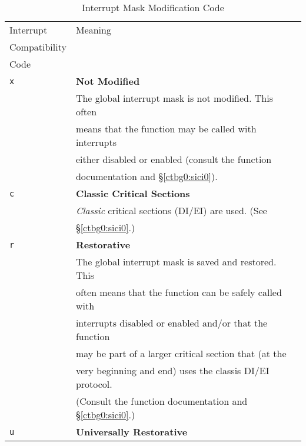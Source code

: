 \begin{table}
\caption{Interrupt Mask Modification Code}
\label{tbl:ciov0:slcv0:sfnc0:02}
\begin{center}
\begin{tabular}{|l|l|}
\hline
Interrupt     & Meaning                                                          \\
Compatibility &                                                                  \\
Code          &                                                                  \\
\hline
\hline
\texttt{x}    & \textbf{Not Modified}                                            \\
              & The global interrupt mask is not modified.  This often           \\
              & means that the function may be called with interrupts            \\
              & either disabled or enabled (consult the function                 \\
              & documentation and \S{}\ref{ctbg0:sici0}).                        \\
\hline
\texttt{c}    & \textbf{Classic Critical Sections}                               \\
              & \emph{Classic} critical sections (DI/EI) are used.  (See         \\
              & \S{}\ref{ctbg0:sici0}.)                                          \\
\hline
\texttt{r}    & \textbf{Restorative}                                             \\
              & The global interrupt mask is saved and restored.  This           \\
              & often means that the function can be safely called with          \\
              & interrupts disabled or enabled and/or that the function          \\
              & may be part of a larger critical section that (at the            \\
              & very beginning and end) uses the classis DI/EI protocol.         \\
              & (Consult the function documentation and \S{}\ref{ctbg0:sici0}.)  \\
\hline
\texttt{u}    & \textbf{Universally Restorative}                                 \\

\end{tabular}
\end{center}
\end{table}
